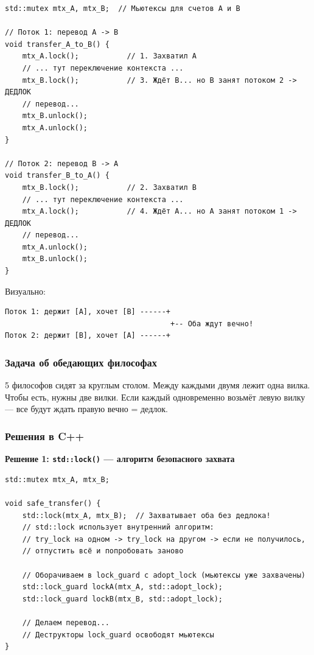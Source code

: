 \documentclass[a4paper,12pt]{article}
\begin{document}
\begin{lstlisting}
std::mutex mtx_A, mtx_B;  // Мьютексы для счетов A и B

// Поток 1: перевод A -> B
void transfer_A_to_B() {
    mtx_A.lock();           // 1. Захватил A
    // ... тут переключение контекста ...
    mtx_B.lock();           // 3. Ждёт B... но B занят потоком 2 -> ДЕДЛОК
    // перевод...
    mtx_B.unlock();
    mtx_A.unlock();
}

// Поток 2: перевод B -> A
void transfer_B_to_A() {
    mtx_B.lock();           // 2. Захватил B
    // ... тут переключение контекста ...
    mtx_A.lock();           // 4. Ждёт A... но A занят потоком 1 -> ДЕДЛОК
    // перевод...
    mtx_A.unlock();
    mtx_B.unlock();
}
\end{lstlisting}

Визуально:

\begin{lstlisting}[numbers=none]
Поток 1: держит [A], хочет [B] ------+
                                      +-- Оба ждут вечно!
Поток 2: держит [B], хочет [A] ------+
\end{lstlisting}

\subsubsection{Задача об обедающих философах}

5 философов сидят за круглым столом. Между каждыми двумя лежит одна вилка.
Чтобы есть, нужны две вилки. Если каждый одновременно возьмёт левую вилку ---
все будут ждать правую вечно = дедлок.

\subsubsection{Решения в C++}

\textbf{Решение 1: \texttt{std::lock()} --- алгоритм безопасного захвата}

\begin{lstlisting}
std::mutex mtx_A, mtx_B;

void safe_transfer() {
    std::lock(mtx_A, mtx_B);  // Захватывает оба без дедлока!
    // std::lock использует внутренний алгоритм:
    // try_lock на одном -> try_lock на другом -> если не получилось,
    // отпустить всё и попробовать заново

    // Оборачиваем в lock_guard с adopt_lock (мьютексы уже захвачены)
    std::lock_guard lockA(mtx_A, std::adopt_lock);
    std::lock_guard lockB(mtx_B, std::adopt_lock);

    // Делаем перевод...
    // Деструкторы lock_guard освободят мьютексы
}
\end{lstlisting}
\end{document}
